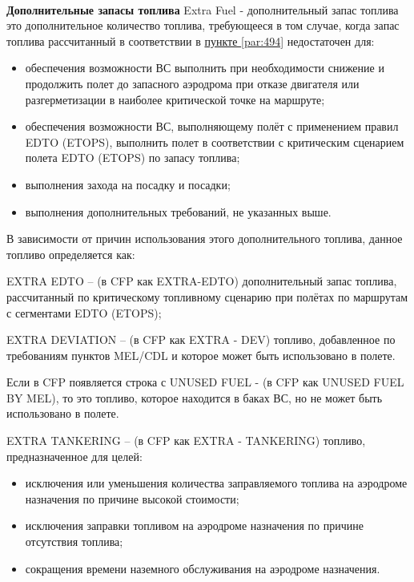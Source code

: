 \paragraph{} \textbf{Дополнительные запасы топлива} \label{par:495}
Extra Fuel - дополнительный запас топлива это дополнительное количество топлива, требующееся в том случае, когда запас топлива рассчитанный в соответствии в \hyperref[par:494]{пункте \ref*{par:494}} недостаточен для:
\begin{itemize}
    \item обеспечения возможности ВС выполнить при необходимости снижение и продолжить полет до запасного аэродрома при отказе двигателя или разгерметизации в наиболее критической точке на маршруте; 
    \item обеспечения возможности ВС, выполняющему полёт с применением правил EDTO (ETOPS), выполнить полет в соответствии с критическим сценарием полета EDTO (ETOPS) по запасу топлива;
    \item выполнения захода на посадку и посадки;
    \item выполнения дополнительных требований, не указанных выше.
\end{itemize}

В зависимости от причин использования этого дополнительного топлива, данное топливо определяется как:

EXTRA EDTO – (в CFP как EXTRA-EDTO) дополнительный запас топлива, рассчитанный по критическому топливному сценарию при полётах по маршрутам с сегментами EDTO (ETOPS); 

EXTRA DEVIATION – (в CFP как EXTRA - DEV) топливо, добавленное по требованиям пунктов MEL/CDL и которое может быть использовано в полете. 

Если в CFP появляется строка с UNUSED FUEL - (в CFP как UNUSED FUEL BY MEL), то это топливо, которое находится в баках ВС, но не может быть использовано в полете. 

EXTRA TANKERING – (в CFP как EXTRA - TANKERING) топливо, предназначенное для целей: 
\begin{itemize}
    \item исключения или уменьшения количества заправляемого топлива на аэродроме назначения по причине высокой стоимости; 
    \item исключения заправки топливом на аэродроме назначения по причине отсутствия топлива;
    \item сокращения времени наземного обслуживания на аэродроме назначения.
\end{itemize}
	 
